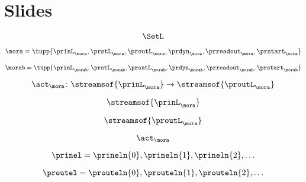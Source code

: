 
\section{Slides}

    \begin{forslides}
        
    \begin{equation}
        \label{eq:slides-processes-000}
        \SetL
    \end{equation}
        
    \begin{equation}
        \label{eq:slides-processes-00}
       \mora = \tupp{\prinL_\mora,\prstL_\mora,\proutL_\mora,\prdyn_\mora,\prreadout_\mora,\prstart_\mora}
    \end{equation}
    
    \begin{equation}
        \label{eq:slides-processes-00b}
       \morab = \tupp{\prinL_{\morab},\prstL_{\morab},\proutL_{\morab},\prdyn_{\morab},\prreadout_{\morab},\prstart_{\morab}}
    \end{equation}

    \begin{equation}
        \label{eq:slides-processes-01}
        \act_{\mora} \colon \streamsof{\prinL_\mora}  \to \streamsof{\proutL_\mora}
    \end{equation}

    \begin{equation}
        \label{eq:slides-processes-02}
        \streamsof{\prinL_\mora}
    \end{equation}

    \begin{equation}
        \label{eq:slides-processes-03}
        \streamsof{\proutL_\mora}
    \end{equation}

    \begin{equation}
        \label{eq:slides-processes-04}
        \act_{\mora}
    \end{equation}

    \begin{equation}
        \label{eq:slides-processes-05}
        \prinel = \prineln{0}, \prineln{1}, \prineln{2}, \ldots
    \end{equation}
    
    \begin{equation}
        \label{eq:slides-processes-05b}
        \proutel = \prouteln{0}, \prouteln{1}, \prouteln{2}, \ldots
    \end{equation}


\end{forslides}
